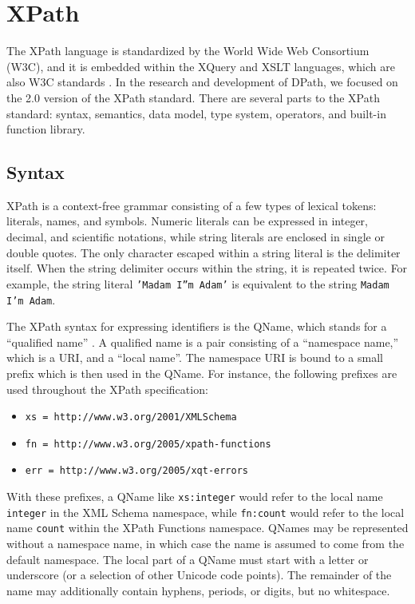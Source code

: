 \documentclass{scrartcl}
\begin{document}
\section{XPath}
\label{sec:xpath}

The XPath language is standardized by the World Wide Web Consortium (W3C), and
it is embedded within the XQuery and XSLT languages, which are also W3C
standards \cite{xpath}. In the research and development of DPath, we focused on
the 2.0 version of the XPath standard. There are several parts to the XPath
standard: syntax\cite{xpath}, semantics\cite{xpath-semantics}, data model, type
system\cite{xpath-datamodel}, operators, and built-in function
library\cite{xpath-functions}.

\subsection{Syntax}

XPath is a context-free grammar consisting of a few types of lexical tokens:
literals, names, and symbols. Numeric literals can be expressed in integer,
decimal, and scientific notations, while string literals are enclosed in single
or double quotes. The only character escaped within a string literal is the
delimiter itself. When the string delimiter occurs within the string, it is
repeated twice. For example, the string literal \texttt{'Madam I''m Adam'} is
equivalent to the string \texttt{Madam I'm Adam}.

The XPath syntax for expressing identifiers is the QName, which stands for a
``qualified name'' \cite{xml-names}. A qualified name is a pair consisting of a
``namespace name,'' which is a URI, and a ``local name''. The namespace URI is
bound to a small prefix which is then used in the QName. For instance, the
following prefixes are used throughout the XPath specification\cite{xpath}:

\begin{itemize}
\item \texttt{xs = http://www.w3.org/2001/XMLSchema}
\item \texttt{fn = http://www.w3.org/2005/xpath-functions}
\item \texttt{err = http://www.w3.org/2005/xqt-errors}
\end{itemize}

With these prefixes, a QName like \texttt{xs:integer} would refer to the local
name \texttt{integer} in the XML Schema namespace, while \texttt{fn:count} would
refer to the local name \texttt{count} within the XPath Functions namespace.
QNames may be represented without a namespace name, in which case the name is
assumed to come from the default namespace. The local part of a QName must start
with a letter or underscore (or a selection of other Unicode code points). The
remainder of the name may additionally contain hyphens, periods, or digits, but
no whitespace.
\end{document}

